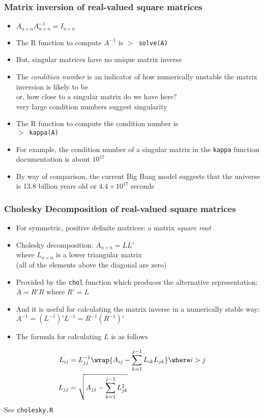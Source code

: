 \documentclass[11pt,pdftex,dvipsnames,usenames,helvetica]{beamer}
\begin{document}
\begin{frame}[fragile]
\frametitle{Matrix inversion of real-valued square matrices}

\begin{itemize}
\item $ A_{n \times n} A^{-1}_{n \times n}=I_{n \times n}$
\item The R function to compute $A^{-1}$ is {\tt $>$ solve(A) }
\item But, singular matrices have no unique matrix inverse
\item The {\it condition number} is an indicator of how
numerically unstable the matrix inversion is likely to be\\
or, how close to a singular matrix do we have here?\\
very large condition numbers suggest singularity
\item The R function to compute the condition number is\\
 {\tt $>$ kappa(A) }
\item For example, the condition number of a singular
matrix in the {\tt kappa} function documentation is
about $10^{17}$
\item By way of comparison, the current Big Bang model suggests that
  the universe is 13.8 billion years old or $4.4\times 10^{17}$ seconds
\end{itemize}
\end{frame}

\begin{frame}[fragile]
\frametitle{Cholesky Decomposition of real-valued square matrices}

\begin{itemize}
\item For symmetric, positive definite matrices: a matrix {\it square root}
\item Cholesky decomposition: $A_{n \times n} = L L'$\\
 where $L_{n \times n}$ is a lower triangular matrix\\
(all of the elements above the diagonal are zero)
\item Provided by the {\tt chol} function which produces the 
alternative representation: $A = R' R$ where $R'=L$
\item And it is useful for calculating 
the matrix inverse in a numerically stable way: $A^{-1} = (L^{-1})' L^{-1}
= R^{-1} (R^{-1})'$
\item The formula for calculating $L$ is as follows
\end{itemize}
\begin{align*}
L_{ij} & = L_{jj}^{-1} \wrap{A_{ij} - \sum_{k=1}^{j-1} L_{ik} L_{jk}} 
\where i>j \\
L_{jj} & = \sqrt{A_{jj} - \sum_{k=1}^{j-1} L_{jk}^2} 
\end{align*}
See {\tt cholesky.R}
\end{frame}
\end{document}
